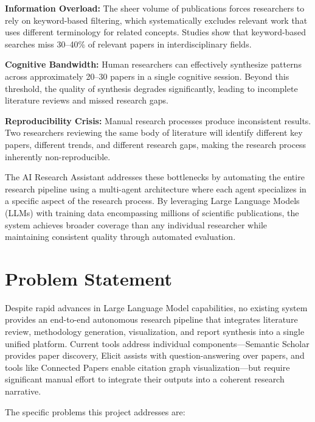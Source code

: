 \documentclass[a4paper,12pt,openany]{report}
\begin{document}
\textbf{Information Overload:} The sheer volume of publications forces researchers to rely on keyword-based filtering, which systematically excludes relevant work that uses different terminology for related concepts. Studies show that keyword-based searches miss 30--40\% of relevant papers in interdisciplinary fields.

\textbf{Cognitive Bandwidth:} Human researchers can effectively synthesize patterns across approximately 20--30 papers in a single cognitive session. Beyond this threshold, the quality of synthesis degrades significantly, leading to incomplete literature reviews and missed research gaps.

\textbf{Reproducibility Crisis:} Manual research processes produce inconsistent results. Two researchers reviewing the same body of literature will identify different key papers, different trends, and different research gaps, making the research process inherently non-reproducible.

The AI Research Assistant addresses these bottlenecks by automating the entire research pipeline using a multi-agent architecture where each agent specializes in a specific aspect of the research process. By leveraging Large Language Models (LLMs) with training data encompassing millions of scientific publications, the system achieves broader coverage than any individual researcher while maintaining consistent quality through automated evaluation.

\section{Problem Statement}

Despite rapid advances in Large Language Model capabilities, no existing system provides an end-to-end autonomous research pipeline that integrates literature review, methodology generation, visualization, and report synthesis into a single unified platform. Current tools address individual components---Semantic Scholar provides paper discovery, Elicit assists with question-answering over papers, and tools like Connected Papers enable citation graph visualization---but require significant manual effort to integrate their outputs into a coherent research narrative.

The specific problems this project addresses are:
\end{document}
